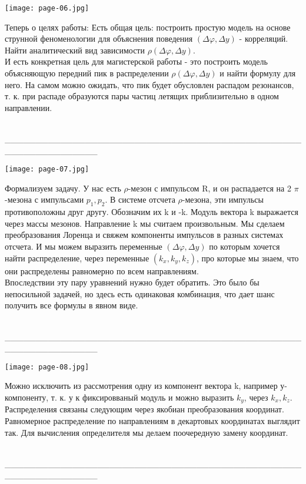 \documentclass[12pt]{article}
\renewcommand{\phi}{\varphi}
\def\Dphi{\Delta\phi}
\def\Dy{\Delta y}
\def\p{$\pi$}
\def\ro{$\rho$}
\renewcommand{\line}{\\ \_\_\_\_\_\_\_\_\_\_\_\_\_\_\_\_\_\_\_\_\_\_\_\_\_\_\_\_\_\_\_\_\_\_\_\_\_\_\_\_\_\_\_\_\_\_\_\_\_\_\_\_\_\_\_\_\_\_\_\_\_\_\_ \\ }
\begin{document}
\begin{minipage}[h]{0.39\linewidth}
	\texttt{[image: page-06.jpg]}
\end{minipage}
\begin{minipage}[h]{0.6\linewidth}
	Теперь о целях работы:
	Есть общая цель: построить простую модель на основе струнной феноменологии для объяснения поведения $(\Dphi, \Dy)$ - корреляций. Найти аналитический вид зависимости $\rho(\Dphi, \Dy)$. \\
	\qquad И есть конкретная цель для магистерской работы - это построить модель объясняющую передний пик в  распределении $\rho(\Dphi, \Dy)$ и найти формулу для него. На самом можно ожидать, что пик будет обусловлен распадом резонансов, т. к. при распаде образуются пары частиц летящих приблизительно в одном направлении.
\end{minipage}
\line

\begin{minipage}[h]{0.39\linewidth}
	\texttt{[image: page-07.jpg]}
\end{minipage}
\begin{minipage}[h]{0.6\linewidth}
	Формализуем задачу. У нас есть \ro-мезон с импульсом R, и он распадается на 2 \p-мезона с импульсами $p_1, p_2$. В системе отсчета \ro-мезона, эти импульсы противоположны друг другу. Обозначим их k и -k. Модуль вектора k выражается через массы мезонов. Направление k мы считаем произвольным. Мы сделаем преобразования Лоренца и свяжем компоненты импульсов в разных системах отсчета. И мы можем выразить переменные $(\Dphi, \Dy)$ по которым хочется найти распределение, через переменные $(k_x, k_y, k_z)$, про которые мы знаем, что они распределены равномерно по всем направлениям. \\
	\qquad Впоследствии эту пару уравнений нужно будет обратить. Это было бы непосильной задачей, но здесь есть одинаковая комбинация, что дает шанс получить все формулы в явном виде.
\end{minipage}
\line

\begin{minipage}[h]{0.29\linewidth}
	\texttt{[image: page-08.jpg]}
\end{minipage}
\begin{minipage}[h]{0.7\linewidth}
	Можно исключить из рассмотрения одну из компонент вектора k, например у-компоненту, т. к. у к фиксировваный модуль и можно выразить $k_y$, через $k_x, k_z$. Распределения связаны следующим через якобиан преобразования координат. Равномерное распределение по направлениям в декартовых координатах выглядит так. Для вычисления определителя мы делаем поочередную замену координат.
\end{minipage}
\line
\end{document}
